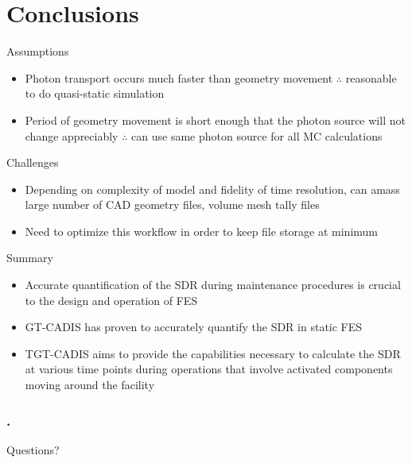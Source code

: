 \documentclass{beamer}
\begin{document}
\section{Conclusions}
\begin{frame}{Assumptions}
			\begin{itemize}
				\item{Photon transport occurs much faster than
					geometry movement $\therefore$
					reasonable to do quasi-static
					simulation}
				\item{Period of geometry movement is short
					enough that the photon source will not
					change appreciably $\therefore$ can use
					same photon source for all MC
					calculations}
			\end{itemize}
	\end{frame}
\begin{frame}{Challenges}
			\begin{itemize}
				\item{Depending on complexity of model and
					fidelity of time resolution, can amass
					large number of CAD geometry files,
					volume mesh tally files}
				\item{Need to optimize this workflow in order
					to keep file storage at minimum}
			\end{itemize}
\end{frame}

\begin{frame}{Summary}
	\begin{itemize}
		\item{Accurate quantification of the SDR during maintenance
			procedures is crucial to the design and operation of
			FES}
		\item{GT-CADIS has proven to accurately quantify the SDR in
			static FES}
		\item{TGT-CADIS aims to provide the capabilities necessary to
			calculate the SDR at various time points during
			operations that involve activated components moving
			around the facility}
	\end{itemize}
\end{frame}

\begin{frame}[c]
	\frametitle{\tiny{.}}
	\begin{center}
	{\Huge Questions?}
	\end{center}
\end{frame}
\end{document}
